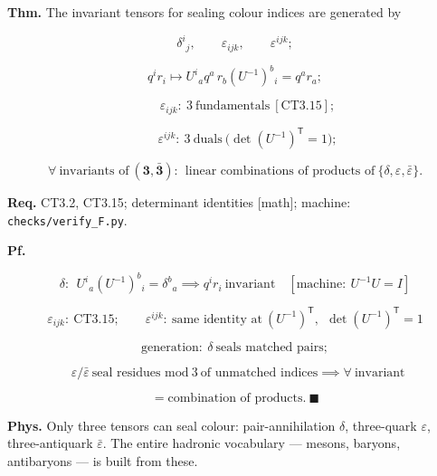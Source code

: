 \begin{theorem}\label{tag:CT3-17}
\textbf{Thm.} The invariant tensors for sealing colour indices are generated by

\[
\delta^i{}_j,\qquad\varepsilon_{ijk},\qquad\varepsilon^{ijk};
\]

\[
q^ir_i\mapsto U^i{}_aq^a\,r_b(U^{-1})^b{}_i=q^ar_a;
\]

\[
\qquad \varepsilon_{ijk}:\ 3\ \text{fundamentals}\ [\mathrm{CT3.15}];
\]

\[
\qquad \varepsilon^{ijk}:\ 3\ \text{duals}\ \bigl(\det(U^{-1})^{\mathsf T}=1\bigr);
\]

\[
\forall\ \text{invariants of}\ (\mathbf3,\bar{\mathbf3}):\ \ \text{linear combinations of products of}\ \{\delta,\varepsilon,\bar\varepsilon\}.
\]

\textbf{Req.} CT3.2, CT3.15; determinant identities [math]; machine: \texttt{checks/\allowbreak{}verify\_\allowbreak{}F.py}.

\textbf{Pf.}

\[
\delta:\ \ U^i{}_a(U^{-1})^b{}_i=\delta^b{}_a\implies q^ir_i\ \text{invariant}\quad[\text{machine}:\ U^{-1}U=I]
\]

\[
\varepsilon_{ijk}:\ \mathrm{CT3.15};\qquad
\varepsilon^{ijk}:\ \text{same identity at}\ (U^{-1})^{\mathsf T},\ \ \det(U^{-1})^{\mathsf T}=1
\]

\[
\text{generation}:\ \delta\ \text{seals matched pairs};
\]

\[
\ \ \varepsilon/\bar\varepsilon\ \text{seal residues mod}\ 3\ \text{of unmatched indices}\implies\forall\ \text{invariant}
\]

\[
= \text{combination of products}.\ \blacksquare
\]

\textbf{Phys.} Only three tensors can seal colour: pair-annihilation $\delta$, three-quark $\varepsilon$, three-antiquark $\bar\varepsilon$. The entire hadronic vocabulary — mesons, baryons, antibaryons — is built from these.

\end{theorem}

